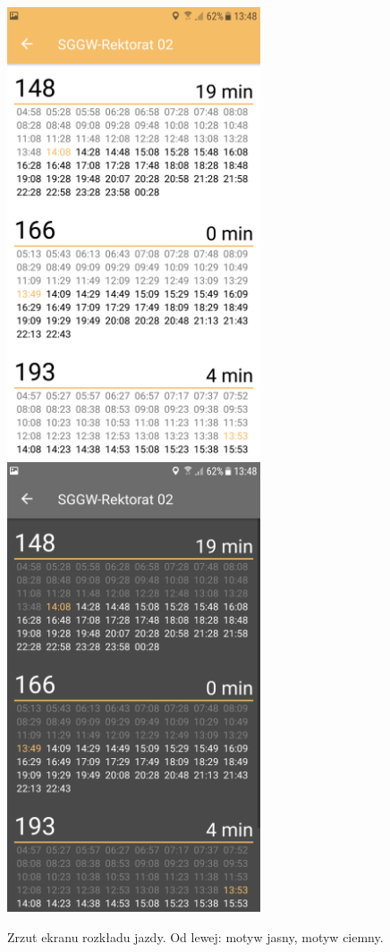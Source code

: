 \documentclass{SGGW-thesis}
\begin{document}
\begin{figure}[!htb]
  \centering
  \includegraphics[width=75mm]{screeny/rozklad_jasny}
  \enspace
  \includegraphics[width=75mm]{screeny/rozklad_ciemny}
  \caption[Rozkład jazdy]{
    \label{screen.rozklad_jazdy}
    Zrzut ekranu rozkładu jazdy. Od lewej: motyw jasny, motyw ciemny. \vspace{2ex}
  }
\end{figure}
\end{document}
